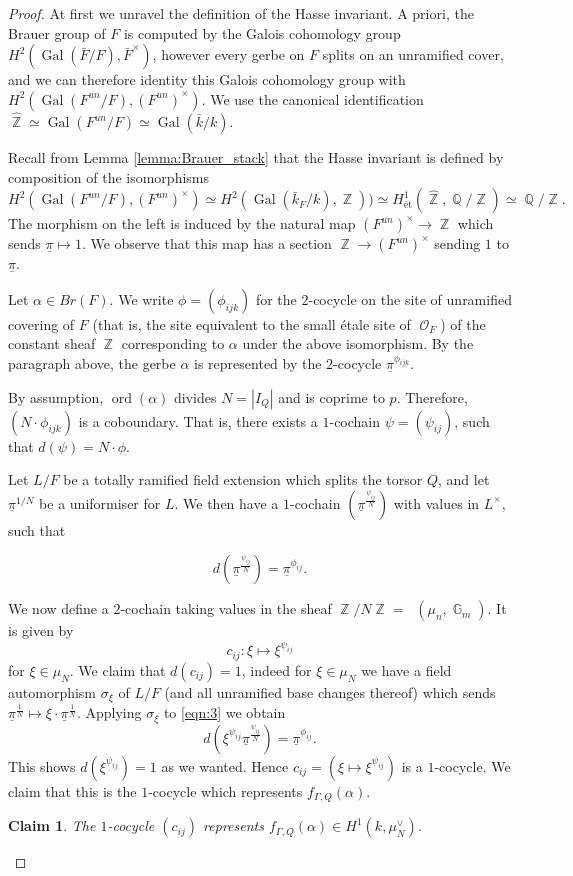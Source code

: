 \documentclass{article}
\DeclareMathOperator{\Hom}{\mathsf{Hom}}
\DeclareMathOperator{\Zb}{\mathbb{Z}}
\DeclareMathOperator{\Gal}{Gal}
\DeclareMathOperator{\G}{\mathbb{G}}
\DeclareMathOperator{\Hhom}{\underline{\Hom}}
\DeclareMathOperator{\Oo}{\mathcal{O}}
\DeclareMathOperator{\ord}{ord}
\DeclareMathOperator{\Qb}{\mathbb{Q}}
\theoremstyle{definition}
\theoremstyle{plain}
\newtheorem{claim}[definition]{Claim}
\begin{document}
\begin{proof}
At first we unravel the definition of the Hasse invariant. A priori, the Brauer group of $F$ is computed by the Galois cohomology group $H^2(\Gal(\bar{F}/F),\bar{F}^{\times})$, however every gerbe on $F$ splits on an unramified cover, and we can therefore identity this Galois cohomology group with $H^2(\Gal(F^{un}/F),(F^{un})^{\times})$. We use the canonical identification $\widehat{\Zb} \simeq \Gal(F^{un}/F) \simeq \Gal(\bar{k}/k)$.

Recall from Lemma \ref{lemma:Brauer_stack} that the Hasse invariant is defined by composition of the isomorphisms 
$$H^2(\Gal(F^{un}/F) ,(F^{un})^{\times}) \simeq H^2(\Gal(\bar{k}_F/k),\Zb)) \simeq H^1_{\text{\'et}}(\widehat{\Zb},\Qb/\Zb) \simeq \Qb/\Zb.$$
The morphism on the left is induced by the natural map $(F^{un})^{\times} \to \Zb$ which sends $\underline{\pi} \mapsto 1$. We observe  that this map has a section $\Zb \to (F^{un})^{\times}$ sending $1$ to $\underline{\pi}$.

Let $\alpha \in Br(F)$. We write $\phi=(\phi_{ijk})$ for the $2$-cocycle on the site of unramified covering of $F$ (that is, the site equivalent to the small \'etale site of $\Oo_F$) of the constant sheaf $\Zb$ corresponding to $\alpha$ under the above isomorphism. By the paragraph above, the gerbe $\alpha$ is represented by the $2$-cocycle $\underline{\pi}^{\phi_{ijk}}$.

By assumption, $\ord(\alpha)$ divides $N=|I_Q|$ and is coprime to $p$. Therefore, $(N\cdot{}\phi_{ijk})$ is a coboundary. That is, there exists a $1$-cochain $\psi=(\psi_{ij})$, such that $d(\psi) = N \cdot \phi$.

Let $L/F$ be a totally ramified field extension which splits the torsor $Q$, and let $\underline{\pi}^{1/N}$ be a uniformiser for $L$. We then have a $1$-cochain $(\underline{\pi}^{\frac{\psi_{ij}}{N}})$ with values in $L^{\times}$, such that 

\begin{equation}\label{eqn:3}d(\underline{\pi}^{\frac{\psi_{ij}}{N}}) = \underline{\pi}^{\phi_{ij}}.\end{equation}

We now define a $2$-cochain taking values in the sheaf $\Zb/N\Zb = \Hhom(\mu_n,\G_m)$. It is given by 
$$c_{ij}\colon \xi \mapsto \xi^{\psi_{ij}}$$
for $\xi \in \mu_N$. We claim that $d(c_{ij}) = 1$, indeed for $\xi \in \mu_N$ we have a field automorphism $\sigma_{\xi}$ of $L/F$ (and all unramified base changes thereof) which sends $\underline{\pi}^{\frac{1}{N}} \mapsto \xi \cdot{} \underline{\pi}^{\frac{1}{N}}$. Applying $\sigma_{\xi}$ to \eqref{eqn:3} we obtain
$$d(\xi^{\psi_{ij}} \underline{\pi}^{\frac{\psi_{ij}}{N}}) = \underline{\pi}^{\phi_{ij}}.$$
This shows $d(\xi^{\psi_{ij}}) = 1$ as we wanted. Hence $c_{ij}= (\xi \mapsto \xi^{\psi_{ij}})$ is a $1$-cocycle. 
We claim that this is the $1$-cocycle which represents $f_{\Gamma,Q}(\alpha)$. 
\begin{claim}
The $1$-cocycle $(c_{ij})$ represents $f_{\Gamma,Q}(\alpha) \in H^1(k,\mu_N^{\vee})$.
\end{claim}


\end{proof}
\end{document}

